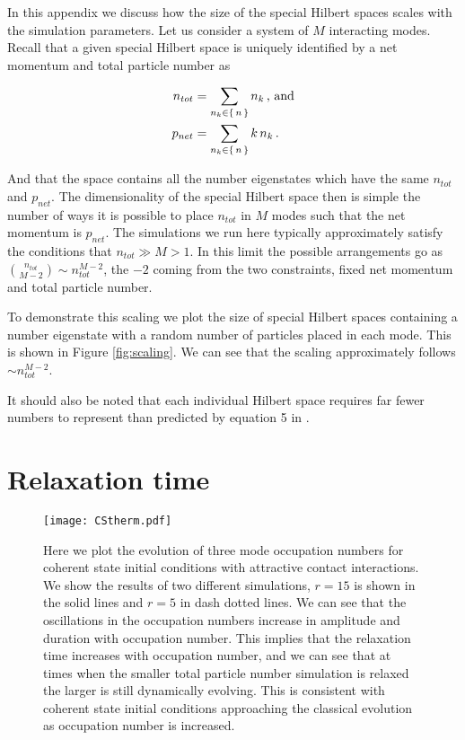 \documentclass[aps,prd,twocolumn,superscriptaddress]{revtex4-1}
\begin{document}
In this appendix we discuss how the size of the special Hilbert spaces scales with the simulation parameters. Let us consider a system of $M$ interacting modes. Recall that a given special Hilbert space is uniquely identified by a net momentum and total particle number as 

\begin{align}
    n_{tot} &= \sum_{n_k \in \set{n}} n_k \, \textrm{, and} \\
    p_{net} &= \sum_{n_k \in \set{n}} k \, n_k \, .
\end{align}

And that the space contains all the number eigenstates which have the same $n_{tot}$ and $p_{net}$. The dimensionality of the special Hilbert space then is simple the number of ways it is possible to place $n_{tot}$ in $M$ modes such that the net momentum is $p_{net}$. The simulations we run here typically approximately satisfy the conditions that $n_{tot} \gg M > 1$. In this limit the possible arrangements go as $\binom{n_{tot}}{M-2} \sim n_{tot}^{M-2}$, the $-2$ coming from the two constraints, fixed net momentum and total particle number. 

To demonstrate this scaling we plot the size of special Hilbert spaces containing a number eigenstate with a random number of particles placed in each mode. This is shown in Figure \ref{fig:scaling}. We can see that the scaling approximately follows 
$\sim n_{tot}^{M-2}$.

It should also be noted that each individual Hilbert space requires far fewer numbers to represent than predicted by equation 5 in \cite{Sikivie2017}.

\section{Relaxation time}

\begin{figure}
	\texttt{[image: CStherm.pdf]}
	\caption{ Here we plot the evolution of three mode occupation numbers for coherent state initial conditions with attractive contact interactions. We show the results of two different simulations, $r=15$ is shown in the solid lines and $r=5$ in dash dotted lines. We can see that the oscillations in the occupation numbers increase in amplitude and duration with occupation number. This implies that the relaxation time increases with occupation number, and we can see that at times when the smaller total particle number simulation is relaxed the larger is still dynamically evolving. This is consistent with coherent state initial conditions approaching the classical evolution as occupation number is increased.}
	\label{fig:csRelax}
\end{figure}
\end{document}
